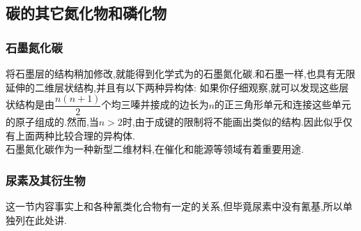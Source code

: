 \documentclass{ctexart}
\begin{document}
\subsection{碳的其它氮化物和磷化物}
\subsubsection{石墨氮化碳}
将石墨层的结构稍加修改,就能得到化学式为的石墨氮化碳.和石墨一样,也具有无限延伸的二维层状结构,并且有以下两种异构体:
如果你仔细观察,就可以发现这些层状结构是由$\dfrac{n(n+1)}{2}$个均三嗪并接成的边长为$n$的正三角形单元和连接这些单元的原子组成的.然而,当$n>2$时,由于成键的限制将不能画出类似的结构.因此似乎仅有上面两种比较合理的异构体.\\
\indent 石墨氮化碳作为一种新型二维材料,在催化和能源等领域有着重要用途.
\subsubsection{尿素及其衍生物}
这一节内容事实上和各种氰类化合物有一定的关系,但毕竟尿素中没有氰基,所以单独列在此处讲.
\end{document}
